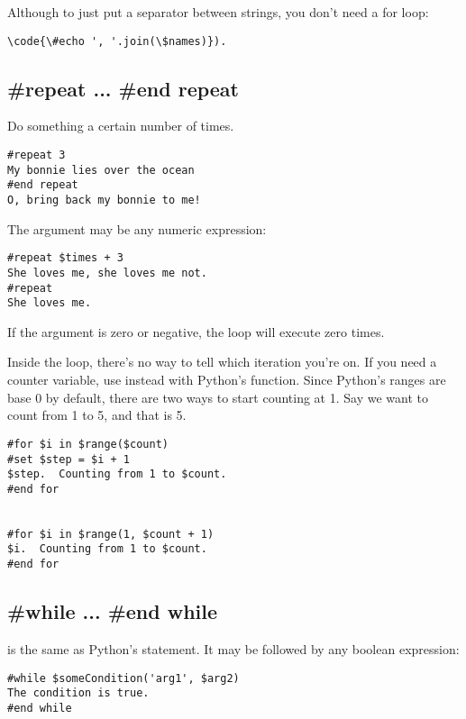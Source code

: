 Although to just put a separator between strings, you don't need a for loop:
\begin{verbatim}
\code{\#echo ', '.join(\$names)}).
\end{verbatim}

\subsection{\#repeat ... \#end repeat}
\label{flowControl.repeat}

Do something a certain number of times.
\begin{verbatim}
#repeat 3
My bonnie lies over the ocean
#end repeat
O, bring back my bonnie to me!
\end{verbatim}

The argument may be any numeric expression:
\begin{verbatim}
#repeat $times + 3
She loves me, she loves me not.
#repeat
She loves me.
\end{verbatim}

If the argument is zero or negative, the loop will execute zero times.

Inside the loop, there's no way to tell which iteration you're on.  If you
need a counter variable, use  instead with Python's 
function.  Since Python's ranges are base 0 by default, there are two ways
to start counting at 1.  Say we want to count from 1 to 5, and that
 is 5.
\begin{verbatim}
#for $i in $range($count)
#set $step = $i + 1
$step.  Counting from 1 to $count.
#end for


#for $i in $range(1, $count + 1)
$i.  Counting from 1 to $count.
#end for
\end{verbatim}


\subsection{\#while ... \#end while}
\label{flowControl.while}

 is the same as Python's  statement.  It may be
followed by any boolean expression:
\begin{verbatim}
#while $someCondition('arg1', $arg2)
The condition is true.
#end while
\end{verbatim}

